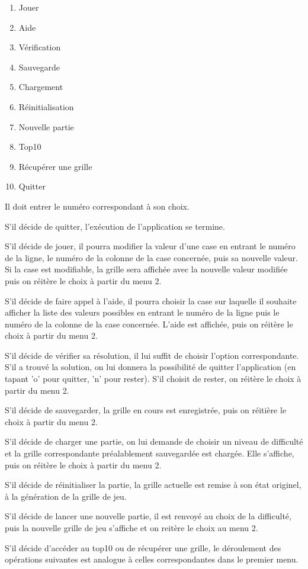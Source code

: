 \documentclass[a4paper, 12pt]{article}
\begin{document}
	\begin{enumerate}
		\item Jouer
		\item Aide
		\item Vérification
		\item Sauvegarde
		\item Chargement
		\item Réinitialisation
		\item Nouvelle partie
		\item Top10
		\item Récupérer une grille
		\item Quitter\\
	\end{enumerate}	 

	\par Il doit entrer le numéro correspondant à son choix.\\

	\par S'il décide de quitter, l'exécution de l'application se termine.
	\par S'il décide de jouer, il pourra modifier la valeur d'une case en entrant le numéro de la ligne, le numéro de la colonne de la case concernée, puis sa nouvelle valeur. Si la case est modifiable, la grille sera affichée avec la nouvelle valeur modifiée puis on réitère le choix à partir du menu 2.
	\par S'il décide de faire appel à l'aide, il pourra choisir la case sur laquelle il souhaite afficher la liste des valeurs possibles en entrant le numéro de la ligne puis le numéro de la colonne de la case concernée. L'aide est affichée, puis on réitère le choix à partir du menu 2.
	\par S'il décide de vérifier sa résolution, il lui suffit de choisir l'option correspondante. S'il a trouvé la solution, on lui donnera la possibilité de quitter l'application (en tapant 'o' pour quitter, 'n' pour rester). S'il choisit de rester, on réitère le choix à partir du menu 2.
	\par S'il décide de sauvegarder, la grille en cours est enregistrée, puis on réitière le choix à partir du menu 2.
	\par S'il décide de charger une partie, on lui demande de choisir un niveau de difficulté et la grille correspondante préalablement sauvegardée est chargée. Elle s'affiche, puis on réitère le choix à partir du menu 2.
	\par S'il décide de réinitialiser la partie, la grille actuelle est remise à son état originel, à la génération de la grille de jeu.
	\par S'il décide de lancer une nouvelle partie, il est renvoyé au choix de la difficulté, puis la nouvelle grille de jeu s'affiche et on reitère le choix au menu 2.
	\par S'il décide d'accéder au top10 ou de récupérer une grille, le déroulement des opérations suivantes est analogue à celles correspondantes dans le premier menu.
	
\end{document}
